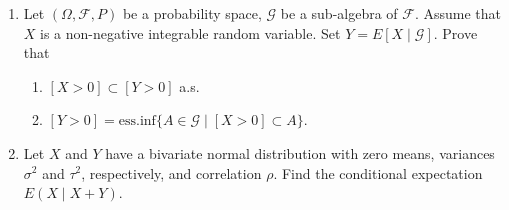\begin{exercise}\label{probability:2012:2}
\begin{enumerate}
    \item Let $(\Omega, \mathcal{F}, P)$ be a probability space, $\mathcal{G}$ be a sub-algebra of $\mathcal{F}$. Assume that $X$ is a non-negative integrable random variable. Set $Y = E[X \mid \mathcal{G}]$. Prove that
    \begin{enumerate}
        \item $[X > 0] \subset [Y > 0]$ a.s.
        \item $[Y > 0] = \mathrm{ess.inf} \{ A \in \mathcal{G} \mid [X > 0] \subset A \}$.
    \end{enumerate}
    \item Let $X$ and $Y$ have a bivariate normal distribution with zero means, variances $\sigma^2$ and $\tau^2$, respectively, and correlation $\rho$. Find the conditional expectation $E(X \mid X + Y)$.
\end{enumerate}
\end{exercise}

